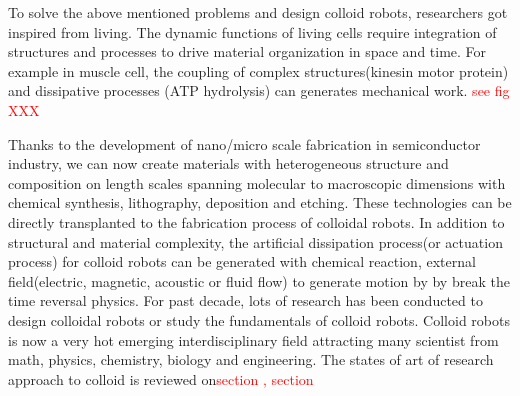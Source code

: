 To solve the above mentioned problems and design colloid robots, researchers got inspired from living. The dynamic functions of living cells require integration of structures and processes to drive material organization in space and time. For example in muscle cell,  the coupling of complex structures(kinesin motor protein) and dissipative processes (ATP hydrolysis) can generates mechanical work. \textcolor{red}{see fig XXX}

Thanks to the development of nano/micro scale fabrication in semiconductor industry, we can now create materials with heterogeneous structure and composition on length scales spanning molecular to macroscopic dimensions with chemical synthesis, lithography, deposition and etching. These technologies can be directly transplanted to the fabrication process of colloidal robots. In addition to structural and material complexity, the artificial dissipation process(or actuation process) for colloid robots  can be generated  with chemical reaction, external field(electric, magnetic, acoustic or fluid flow) to generate motion by by break the time reversal physics. For past decade, lots of research has been conducted to design colloidal robots or study the fundamentals of colloid robots. Colloid robots is now a very hot emerging interdisciplinary field attracting many scientist from math, physics, chemistry, biology and engineering. The states of art of  research approach to colloid is reviewed on\textcolor{red}{section , section }
